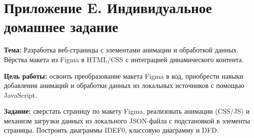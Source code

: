 \section*{Приложение E. Индивидуальное домашнее задание}

\textbf{Тема:} Разработка веб-страницы с элементами анимации и обработкой данных. Вёрстка макета из Figma в HTML/CSS с интеграцией динамического контента.

\textbf{Цель работы:} освоить преобразование макета Figma в код, приобрести навыки добавления анимаций и обработки данных из локальных источников с помощью JavaScript.

\textbf{Задание:} сверстать страницу по макету Figma, реализовать анимации (CSS/JS) и механизм загрузки данных из локального JSON-файла с подстановкой в элементы страницы. Построить диаграммы IDEF0, классовую диаграмму и DFD.


